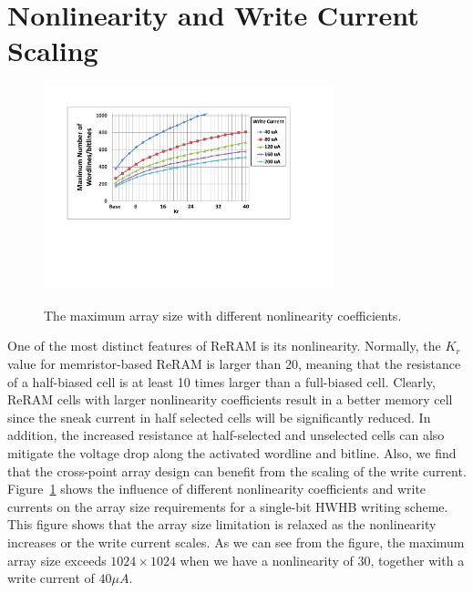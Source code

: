 \vspace{-5pt}
\section{Nonlinearity and Write Current Scaling}\label{sec:scale}
\vspace{-2pt}
\begin{figure}[!b]
\centering
  \vspace{-5pt}
  \includegraphics[width=3.3in]{./figures/non_linear_f}\\
  \vspace{-10pt}
  \caption{The maximum array size with different nonlinearity coefficients.}\label{fig:non_linear}
\end{figure}
One of the most distinct features of ReRAM is its nonlinearity. Normally,
the $K_r$ value for memristor-based ReRAM is larger than 20, meaning that
the resistance of a half-biased cell is at least 10 times larger than a
full-biased cell. Clearly, ReRAM cells with larger nonlinearity
coefficients result in a better memory cell since the sneak current in
half selected cells will be significantly reduced. In addition, the
increased resistance at half-selected and unselected cells can also
mitigate the voltage drop along the activated wordline and bitline. Also,
we find that the cross-point array design can benefit from the scaling of
the write current. Figure~\ref{fig:non_linear} shows the influence of
different nonlinearity coefficients and write currents on the array size
requirements for a single-bit HWHB writing scheme. This figure shows that
the array size limitation is relaxed as the nonlinearity increases or the
write current scales. As we can see from the figure, the maximum array
size exceeds $1024\times 1024$ when we have a nonlinearity of $30$,
together with a write current of $40\mu A$.

